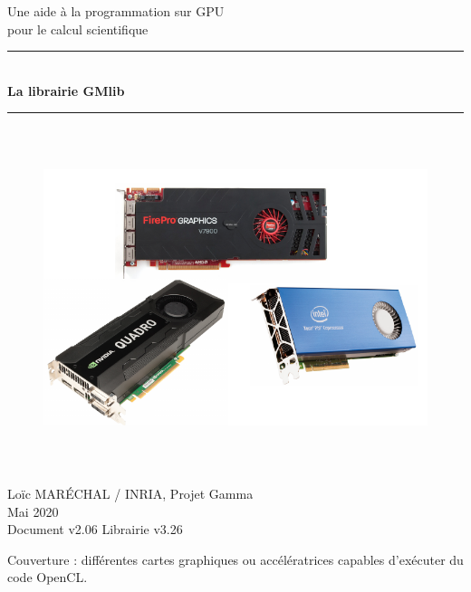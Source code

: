 \documentclass[a4paper,12pt]{article}
\newcommand{\HRule}{\rule{\linewidth}{1mm}}
\begin{document}
%
%

\begin{titlepage}

\begin{center}
\huge Une aide à la programmation sur GPU\\ pour le calcul scientifique
\HRule \\
\medskip
{\Huge \bfseries La librairie GMlib} \\
\HRule
\end{center}


\begin{figure}[htbp]
\begin{center}
\includegraphics[height=10cm]{gpu.pdf}
\end{center}
\end{figure}


\begin{flushright}
\Large Lo\"ic MAR\'ECHAL / INRIA, Projet Gamma\\
\Large Mai 2020 \\
\normalsize Document v2.06
\normalsize Librairie v3.26
\end{flushright}

\end{titlepage}

\clearpage

\setcounter{tocdepth}{2}
\tableofcontents
\vfill

\footnotesize{Couverture : différentes cartes graphiques ou accélératrices capables d'exécuter du code OpenCL.}
\normalsize
\end{document}
